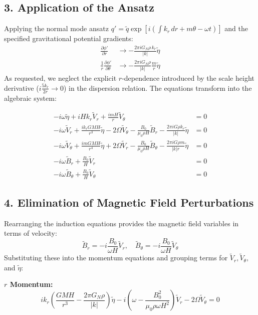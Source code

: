 \documentclass[11pt]{article}
\begin{document}
\subsection*{3. Application of the Ansatz}
Applying the normal mode ansatz $q' = \tilde{q}\exp\left[i\left(\int k_r \, dr + m\theta - \omega t\right)\right]$ and the specified gravitational potential gradients:
\begin{align}
\frac{\partial\phi'}{\partial r} &\to -\frac{2\pi i G_N\rho\, k_r}{|k|}\tilde{\eta} \\
\frac{1}{r}\frac{\partial\phi'}{\partial\theta} &\to -\frac{2\pi i G_N\rho}{|k|}\frac{m}{r}\tilde{\eta}
\end{align}
As requested, we neglect the explicit $r$-dependence introduced by the scale height derivative ($i\frac{5k_r}{2r} \to 0$) in the dispersion relation. The equations transform into the algebraic system:

\begin{align}
-i\omega\tilde{\eta} + i H k_r \tilde{V}_r + \frac{imH}{r}\tilde{V}_\theta &= 0 \\
-i\omega\tilde{V}_r + \frac{i k_r GM H}{r^3}\tilde{\eta} - 2\Omega\tilde{V}_\theta - \frac{B_0}{\mu_0 \rho H}\tilde{B}_r - \frac{2\pi i G \rho k_r}{|k|}\tilde{\eta} &= 0 \\
-i\omega\tilde{V}_\theta + \frac{i m GM H}{r^4}\tilde{\eta} + 2\Omega\tilde{V}_r - \frac{B_0}{\mu_0 \rho H}\tilde{B}_\theta - \frac{2\pi i G \rho m}{|k| r}\tilde{\eta} &= 0 \\
-i\omega\tilde{B}_r + \frac{B_0}{H}\tilde{V}_r &= 0 \\
-i\omega\tilde{B}_\theta + \frac{B_0}{H}\tilde{V}_\theta &= 0
\end{align}

\subsection*{4. Elimination of Magnetic Field Perturbations}
Rearranging the induction equations provides the magnetic field variables in terms of velocity:
\begin{equation}
\tilde{B}_r = -i \frac{B_0}{\omega H} \tilde{V}_r, \quad \tilde{B}_\theta = -i \frac{B_0}{\omega H} \tilde{V}_\theta
\end{equation}
Substituting these into the momentum equations and grouping terms for $\tilde{V}_r, \tilde{V}_\theta,$ and $\tilde{\eta}$:

\textbf{$r$ Momentum:}
\begin{equation}
i k_r \left( \frac{GM H}{r^3} - \frac{2\pi G_N \rho}{|k|} \right) \tilde{\eta} - i \left( \omega - \frac{B_0^2}{\mu_0 \rho \omega H^2} \right) \tilde{V}_r - 2\Omega\tilde{V}_\theta = 0
\end{equation}
\end{document}
